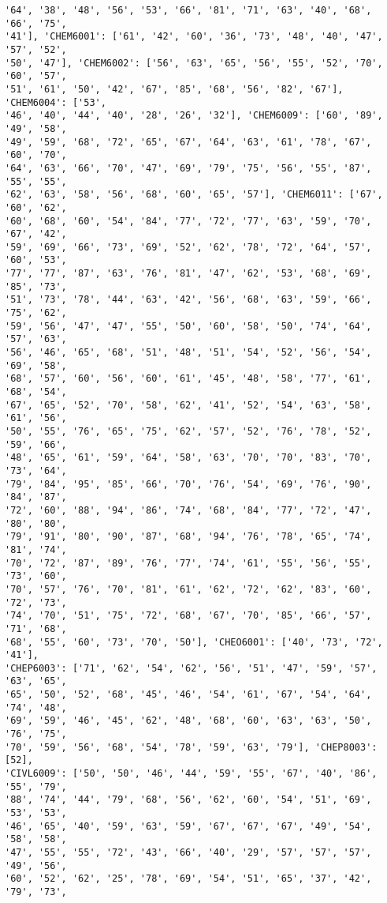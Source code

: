 \documentclass[11pt]{article}
\begin{document}
\begin{Verbatim}[commandchars=\\\{\}]
'64', '38', '48', '56', '53', '66', '81', '71', '63', '40', '68', '66', '75',
'41'], 'CHEM6001': ['61', '42', '60', '36', '73', '48', '40', '47', '57', '52',
'50', '47'], 'CHEM6002': ['56', '63', '65', '56', '55', '52', '70', '60', '57',
'51', '61', '50', '42', '67', '85', '68', '56', '82', '67'], 'CHEM6004': ['53',
'46', '40', '44', '40', '28', '26', '32'], 'CHEM6009': ['60', '89', '49', '58',
'49', '59', '68', '72', '65', '67', '64', '63', '61', '78', '67', '60', '70',
'64', '63', '66', '70', '47', '69', '79', '75', '56', '55', '87', '55', '55',
'62', '63', '58', '56', '68', '60', '65', '57'], 'CHEM6011': ['67', '60', '62',
'60', '68', '60', '54', '84', '77', '72', '77', '63', '59', '70', '67', '42',
'59', '69', '66', '73', '69', '52', '62', '78', '72', '64', '57', '60', '53',
'77', '77', '87', '63', '76', '81', '47', '62', '53', '68', '69', '85', '73',
'51', '73', '78', '44', '63', '42', '56', '68', '63', '59', '66', '75', '62',
'59', '56', '47', '47', '55', '50', '60', '58', '50', '74', '64', '57', '63',
'56', '46', '65', '68', '51', '48', '51', '54', '52', '56', '54', '69', '58',
'68', '57', '60', '56', '60', '61', '45', '48', '58', '77', '61', '68', '54',
'67', '65', '52', '70', '58', '62', '41', '52', '54', '63', '58', '61', '56',
'50', '55', '76', '65', '75', '62', '57', '52', '76', '78', '52', '59', '66',
'48', '65', '61', '59', '64', '58', '63', '70', '70', '83', '70', '73', '64',
'79', '84', '95', '85', '66', '70', '76', '54', '69', '76', '90', '84', '87',
'72', '60', '88', '94', '86', '74', '68', '84', '77', '72', '47', '80', '80',
'79', '91', '80', '90', '87', '68', '94', '76', '78', '65', '74', '81', '74',
'70', '72', '87', '89', '76', '77', '74', '61', '55', '56', '55', '73', '60',
'70', '57', '76', '70', '81', '61', '62', '72', '62', '83', '60', '72', '73',
'74', '70', '51', '75', '72', '68', '67', '70', '85', '66', '57', '71', '68',
'68', '55', '60', '73', '70', '50'], 'CHEO6001': ['40', '73', '72', '41'],
'CHEP6003': ['71', '62', '54', '62', '56', '51', '47', '59', '57', '63', '65',
'65', '50', '52', '68', '45', '46', '54', '61', '67', '54', '64', '74', '48',
'69', '59', '46', '45', '62', '48', '68', '60', '63', '63', '50', '76', '75',
'70', '59', '56', '68', '54', '78', '59', '63', '79'], 'CHEP8003': [52],
'CIVL6009': ['50', '50', '46', '44', '59', '55', '67', '40', '86', '55', '79',
'88', '74', '44', '79', '68', '56', '62', '60', '54', '51', '69', '53', '53',
'46', '65', '40', '59', '63', '59', '67', '67', '67', '49', '54', '58', '58',
'47', '55', '55', '72', '43', '66', '40', '29', '57', '57', '57', '49', '56',
'60', '52', '62', '25', '78', '69', '54', '51', '65', '37', '42', '79', '73',

\end{Verbatim}
\end{document}
